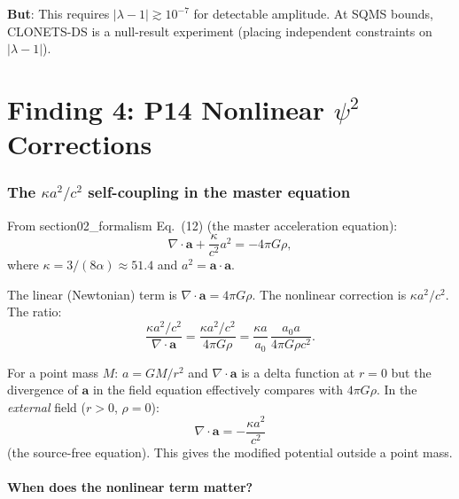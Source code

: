 \documentclass[11pt]{article}
\begin{document}
\textbf{But}: This requires $|\lambda - 1| \gtrsim 10^{-7}$ for
detectable amplitude. At SQMS bounds, CLONETS-DS is a null-result
experiment (placing independent constraints on $|\lambda - 1|$).


\part{Finding 4: P14 Nonlinear $\psi^2$ Corrections}
\label{part:p14}

\section{The $\kappa a^2/c^2$ self-coupling in the master equation}

From section02\_formalism Eq.~(12) (the master acceleration equation):
\begin{equation}
\nabla\cdot\mathbf{a} + \frac{\kappa}{c^2}a^2 = -4\pi G\rho,
\end{equation}
where $\kappa = 3/(8\alpha) \approx 51.4$ and $a^2 = \mathbf{a}\cdot\mathbf{a}$.

The linear (Newtonian) term is $\nabla\cdot\mathbf{a} = 4\pi G\rho$.
The nonlinear correction is $\kappa a^2/c^2$. The ratio:
\begin{equation}
\frac{\kappa a^2/c^2}{\nabla\cdot\mathbf{a}}
= \frac{\kappa a^2/c^2}{4\pi G\rho}
= \frac{\kappa a}{a_0}\,\frac{a_0 a}{4\pi G\rho c^2}.
\end{equation}

For a point mass $M$: $a = GM/r^2$ and $\nabla\cdot\mathbf{a}$ is a
delta function at $r = 0$ but the divergence of $\mathbf{a}$ in the
field equation effectively compares with $4\pi G\rho$. In the
\emph{external} field ($r > 0$, $\rho = 0$):
\begin{equation}
\nabla\cdot\mathbf{a} = -\frac{\kappa a^2}{c^2}
\end{equation}
(the source-free equation). This gives the modified potential
outside a point mass.

\subsection{When does the nonlinear term matter?}
\end{document}
